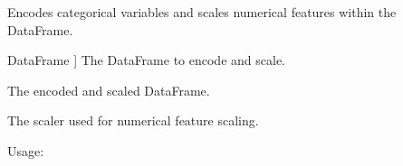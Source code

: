 \documentclass[letterpaper,10pt,english]{sphinxmanual}
\begin{document}

\begin{fulllineitems}
\label{\detokenize{utils:utils.encode_and_scale_dataframe}}
\pysigstartsignatures
{}
\pysigstopsignatures
\sphinxAtStartPar
Encodes categorical variables and scales numerical features within the DataFrame.
\begin{description}
\begin{description}
\sphinxlineitem{df}{[}DataFrame {]}
\sphinxAtStartPar
The DataFrame to encode and scale.

\end{description}

\begin{description}
\sphinxAtStartPar
The encoded and scaled DataFrame.

\sphinxAtStartPar
The scaler used for numerical feature scaling.

\end{description}

\end{description}

\sphinxAtStartPar
Usage:

\end{fulllineitems}

\end{document}
